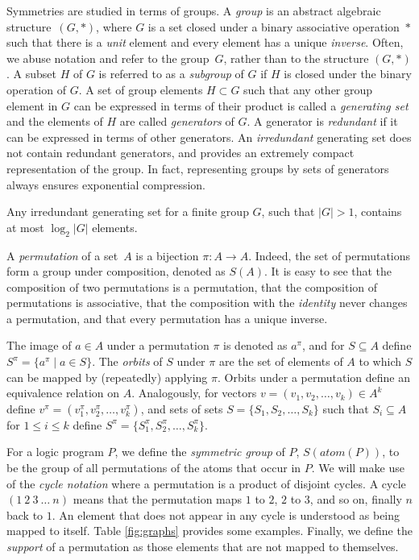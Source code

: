 \documentclass[envcountsame]{llncs}
\newcommand{\atom}[1]{atom(#1)}
\begin{document}
Symmetries are studied in terms of groups. A \emph{group} is an abstract algebraic structure~$(G,\ast)$, where $G$ is a set closed under a binary associative operation~$\ast$ such that there is a \emph{unit} element and every element has a unique \emph{inverse}. Often, we abuse notation and refer to the group~$G$, rather than to the structure $(G,\ast)$. A subset $H$ of $G$ is referred to as a \emph{subgroup} of $G$ if $H$ is closed under the binary operation of $G$. A set of group elements $H \subset G$ such that any other group element in $G$ can be expressed in terms of their product is called a \emph{generating set} and the elements of $H$ are called \emph{generators} of $G$. A generator is \emph{redundant} if it can be expressed in terms of other generators. An \emph{irredundant} generating set does not contain redundant generators, and provides an extremely compact representation of the group. In fact, representing groups by sets of generators always ensures exponential compression.
\begin{theorem}
Any irredundant generating set for a finite group $G$, such that $|G| > 1$, contains at most $\log_2|G|$ elements.
\end{theorem}
A \emph{permutation} of a set~$A$ is a bijection $\pi : A \to A$. Indeed, the set of permutations form a group under composition, denoted as $S(A)$. It is easy to see that the composition of two permutations is a permutation, that the composition of permutations is associative, that the composition with the \emph{identity} never changes a permutation, and that every permutation has a unique inverse.


The image of $a \in A$ under a permutation $\pi$ is denoted as $a^\pi$, and for $S \subseteq A$ define $S^\pi = \{a^\pi \mid a \in S\}$. The \emph{orbits} of $S$ under $\pi$ are the set of elements of $A$ to which $S$ can be mapped by (repeatedly) applying $\pi$. Orbits under a permutation define an equivalence relation on $A$. Analogously, for vectors $v = (v_1, v_2, \dots, v_k) \in A^k$ define $v^\pi = (v_1^\pi, v_2^\pi, \dots, v_k^\pi)$, and sets of sets $S = \{S_1, S_2, \dots, S_k\}$ such that $S_i \subseteq A$ for $1 \leq i \leq k$ define $S^\pi = \{S_1^\pi, S_2^\pi, \dots, S_k^\pi\}$.

For a logic program $P$, we define the \emph{symmetric group} of $P$, $S(\atom{P})$, to be the group of all permutations of the atoms that occur in $P$.
We will make use of the \emph{cycle notation} where a permutation is a product of disjoint cycles. A cycle~$(1\ 2\ 3\ \dots\ n)$ means that the permutation maps $1$ to $2$, $2$ to $3$, and so on, finally $n$ back to $1$. An element that does not appear in any cycle is understood as being mapped to itself. Table \ref{fig:graphs} provides some examples. Finally, we define the \emph{support} \cite{mc81a} of a permutation as those elements that are not mapped to themselves.
\end{document}
